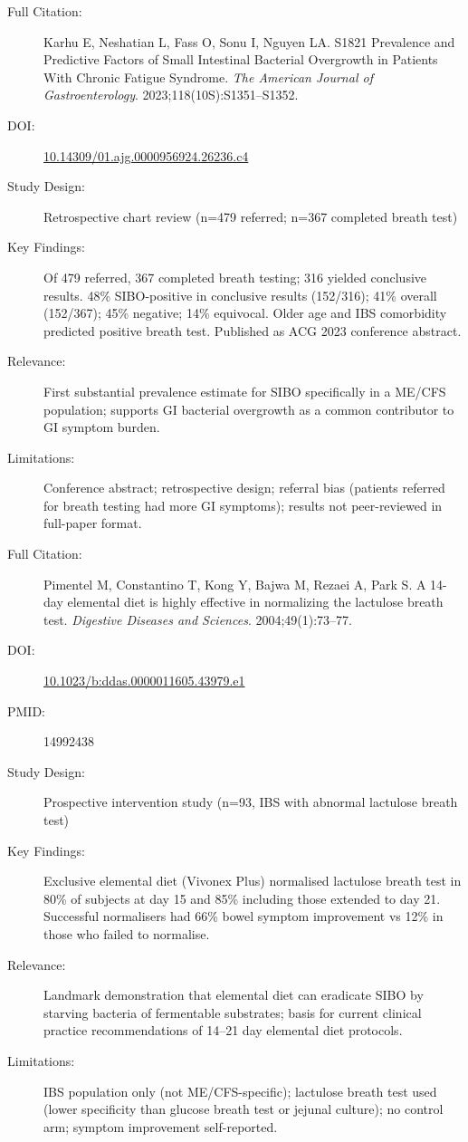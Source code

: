 \begin{description}
    \item[Full Citation:] Karhu E, Neshatian L, Fass O, Sonu I, Nguyen LA. S1821 Prevalence and Predictive Factors of Small Intestinal Bacterial Overgrowth in Patients With Chronic Fatigue Syndrome. \textit{The American Journal of Gastroenterology}. 2023;118(10S):S1351--S1352.
    \item[DOI:] \href{https://doi.org/10.14309/01.ajg.0000956924.26236.c4}{10.14309/01.ajg.0000956924.26236.c4}
    \item[Study Design:] Retrospective chart review (n=479 referred; n=367 completed breath test)
    \item[Key Findings:] Of 479 referred, 367 completed breath testing; 316 yielded conclusive results. 48\% SIBO-positive in conclusive results (152/316); 41\% overall (152/367); 45\% negative; 14\% equivocal. Older age and IBS comorbidity predicted positive breath test. Published as ACG 2023 conference abstract.
    \item[Relevance:] First substantial prevalence estimate for SIBO specifically in a ME/CFS population; supports GI bacterial overgrowth as a common contributor to GI symptom burden.
    \item[Limitations:] Conference abstract; retrospective design; referral bias (patients referred for breath testing had more GI symptoms); results not peer-reviewed in full-paper format.
\end{description}

\begin{description}
    \item[Full Citation:] Pimentel M, Constantino T, Kong Y, Bajwa M, Rezaei A, Park S. A 14-day elemental diet is highly effective in normalizing the lactulose breath test. \textit{Digestive Diseases and Sciences}. 2004;49(1):73--77.
    \item[DOI:] \href{https://doi.org/10.1023/b:ddas.0000011605.43979.e1}{10.1023/b:ddas.0000011605.43979.e1}
    \item[PMID:] 14992438
    \item[Study Design:] Prospective intervention study (n=93, IBS with abnormal lactulose breath test)
    \item[Key Findings:] Exclusive elemental diet (Vivonex Plus) normalised lactulose breath test in 80\% of subjects at day 15 and 85\% including those extended to day 21. Successful normalisers had 66\% bowel symptom improvement vs 12\% in those who failed to normalise.
    \item[Relevance:] Landmark demonstration that elemental diet can eradicate SIBO by starving bacteria of fermentable substrates; basis for current clinical practice recommendations of 14--21 day elemental diet protocols.
    \item[Limitations:] IBS population only (not ME/CFS-specific); lactulose breath test used (lower specificity than glucose breath test or jejunal culture); no control arm; symptom improvement self-reported.
\end{description}

